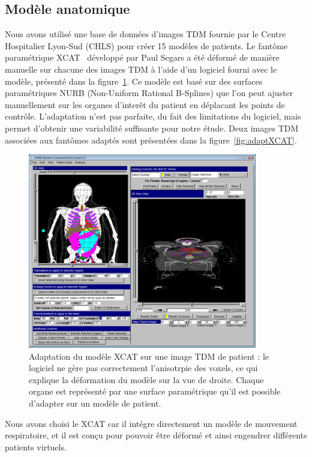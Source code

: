 \subsection{Modèle anatomique}

Nous avons utilisé une base de données d’images TDM fournie par le Centre Hospitalier Lyon-Sud (CHLS) pour créer 15 modèles de patients. Le fantôme paramétrique XCAT~\cite{segars2009mcatoverview} développé par Paul Segars a été déformé de manière manuelle sur chacune des images TDM à l’aide d’un logiciel fourni avec le modèle, présenté dans la figure~\ref{fig:fitXCAT}. Ce modèle est basé sur des surfaces paramétriques NURB (Non-Uniform Rational B-Splines) que l'on peut ajuster manuellement sur les organes d'interêt du patient en déplacant les points de contrôle. L'adaptation n’est pas parfaite, du fait des limitations du logiciel, mais permet d’obtenir une variabilité suffisante pour notre étude. Deux images TDM associées aux fantômes adaptés sont présentées dans la figure~\ref{fig:adaptXCAT}.

\begin{figure}
 \centering
 \includegraphics[width=10cm]{images/FIT_XCAT}
 \caption[Adaptation du modèle XCAT sur une image TDM de patient]{Adaptation du modèle XCAT sur une image TDM de patient : le logiciel ne gère pas correctement l'anisotrpie des voxels, ce qui explique la déformation du modèle sur la vue de droite. Chaque organe est représenté par une surface paramétrique qu’il est possible d’adapter sur un modèle de patient.}
 \label{fig:fitXCAT}
\end{figure}

Nous avons choisi le XCAT car il intégre directement un modèle de mouvement respiratoire, et il est conçu pour pouvoir être déformé et ainsi engendrer différents patients virtuels.

